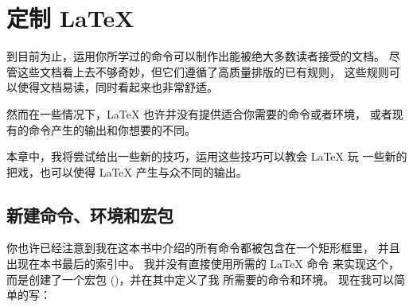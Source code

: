 
\chapter{定制 \LaTeX}
\begin{intro}
到目前为止，运用你所学过的命令可以制作出能被绝大多数读者接受的文档。
尽管这些文档看上去不够奇妙，但它们遵循了高质量排版的已有规则，
这些规则可以使得文档易读，同时看起来也非常舒适。

然而在一些情况下，\LaTeX{} 也许并没有提供适合你需要的命令或者环境，
或者现有的命令产生的输出和你想要的不同。

本章中，我将尝试给出一些新的技巧，运用这些技巧可以教会 \LaTeX{} 玩
一些新的把戏，也可以使得 \LaTeX{} 产生与众不同的输出。
\end{intro}


\section{新建命令、环境和宏包}
你也许已经注意到我在这本书中介绍的所有命令都被包含在一个矩形框里，
并且出现在本书最后的索引中。 我并没有直接使用所需的 \LaTeX{} 命令
来实现这个，而是创建了一个宏包 ()，并在其中定义了我
所需要的命令和环境。 现在我可以简单的写：

